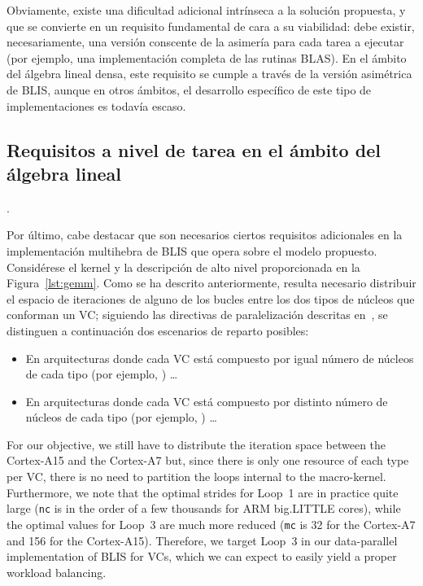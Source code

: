 Obviamente, existe una dificultad adicional intrínseca a la solución propuesta, y que se convierte en un requisito fundamental de cara
a su viabilidad: debe existir, necesariamente, una versión conscente de la asimería para cada tarea a ejecutar (por ejemplo, una implementación
completa de las rutinas BLAS). En el ámbito del álgebra lineal densa, este requisito se cumple a través de la versión asimétrica de BLIS, aunque
en otros ámbitos, el desarrollo específico de este tipo de implementaciones es todavía escaso.

\subsection{Requisitos a nivel de tarea en el ámbito del álgebra lineal}

.

Por último, cabe destacar que son necesarios ciertos requisitos adicionales en la implementación multihebra de BLIS
que opera sobre el modelo propuesto. Considérese el kernel \gemm y la descripción de alto nivel proporcionada en la Figura~\ref{lst:gemm}. 
Como se ha descrito anteriormente, resulta necesario distribuir el espacio de iteraciones de alguno de los bucles entre los dos tipos de núcleos
que conforman un VC; siguiendo las directivas de paralelización descritas en~\cite{BLIS3}, se distinguen a continuación dos escenarios de reparto posibles:

\begin{itemize}
	\item En arquitecturas donde cada VC está compuesto por igual número de núcleos de cada tipo (por ejemplo, \odroid) \ldots

	\item En arquitecturas donde cada VC está compuesto por distinto número de núcleos de cada tipo (por ejemplo, \juno) \ldots

\end{itemize}

For our objective, we still have to distribute the iteration space between the Cortex-A15 and the Cortex-A7 but, since there is only one resource of each type per VC,
there is no need to partition the loops internal to the macro-kernel. 
Furthermore, we note that the optimal strides for Loop~1 are in practice quite
large ({\tt nc} is in the order of a few thousands for ARM big.LITTLE cores), while the optimal values for Loop~3 are much more reduced
({\tt mc} is 32 for the Cortex-A7 and 156 for the Cortex-A15). Therefore, we target Loop~3 in our data-parallel implementation of BLIS for
VCs, which we can expect to easily yield a proper workload balancing.

